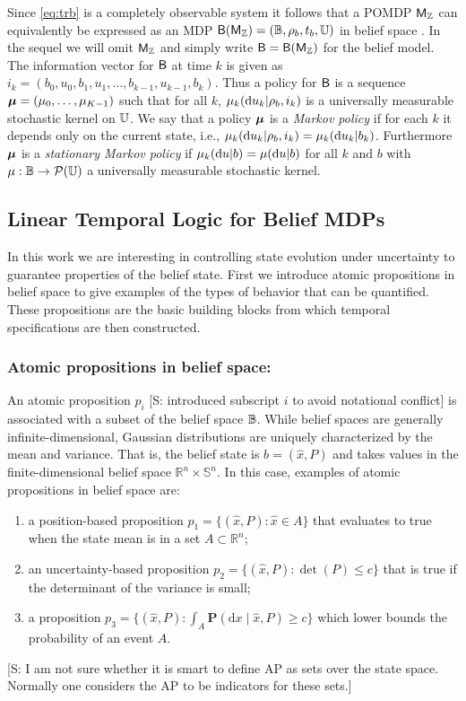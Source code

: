 \documentclass{ifacconf}
\newcommand{\red}[1]{{\color{red} #1}}
\begin{document}
Since \eqref{eq:trb} is a completely observable system it follows that a POMDP $\POMDP$ can equivalently be expressed as an MDP $\MB(\POMDP) = (\Xb, \initb, \trb, \A)$ in belief space \citep{bertsekas2004stochastic}. In the sequel we will omit $\POMDP$ and simply write $\MB = \MB(\POMDP)$ for the belief model. The information vector for $\MB$ at time $k$ is given as $i_k=(b_0, u_0, b_1, u_1, \ldots, b_{k-1}, u_{k-1}, b_k)$. Thus a policy for $\MB$ is a sequence $\polb=(\pol_0,\ldots,\pol_{K-1})$ such that for all $k$, $\pol_k(\mathrm{d}u_k|\initb, i_k)$ is a universally measurable stochastic kernel on $\A$.	We say that a policy $\polb$ is a \emph{Markov policy} if for each $k$ it depends only on the current state, i.e., $\pol_k(\mathrm{d} u_k|\initb, i_k) = \pol_k(\mathrm{d} u_k| b_k)$. Furthermore $\polb$ is a \emph{stationary Markov policy} if $\pol_k(\mathrm{d} u| b)=  \pol(\mathrm{d} u| b)$  for all $k$ and $b$ with $\pol:\mathbb B\rightarrow \mathcal{P}(\A)$ a universally measurable stochastic kernel. %


\subsection{Linear Temporal Logic for Belief MDPs}

In this work we are interesting in controlling state evolution under uncertainty to guarantee properties of the belief state. First we introduce atomic propositions in belief space to give examples of the types of behavior that can be quantified. These propositions are the basic building blocks from which temporal specifications are then constructed.

\subsubsection{Atomic propositions in belief space:}

An atomic proposition $p_i$ \red{[S: introduced subscript $i$ to avoid notational conflict]} is associated with a subset of the belief space $\Xb$. While belief spaces are generally infinite-dimensional, Gaussian distributions are uniquely characterized by the mean and variance. That is, the belief state is $b = (\hat x, P)$ and takes values in the finite-dimensional belief space $\mathbb{R}^n \times \mathbb{S}^n$. In this case, examples of atomic propositions in belief space are:
\begin{enumerate}
  \item a position-based proposition $p_1 = \{ (\hat x, P) : \hat x \in A \}$ that evaluates to true when the state mean is in a set $A \subset \mathbb{R}^n$;
  \item an uncertainty-based proposition $p_2 = \{ (\hat x, P) : \det(P) \leq c \}$ that is true if the determinant of the variance is small;
  \item a proposition $p_3 = \{ (\hat x, P) : \int_{A} \mathbf{P}( \mathrm{d} x \mid \hat x, P) \geq c \}$ which lower bounds the probability of an event $A$.
\end{enumerate}
\red{[S: I am not sure whether it is smart to define AP as sets over the state space. Normally one considers the AP to be indicators for these sets.]}
\end{document}
